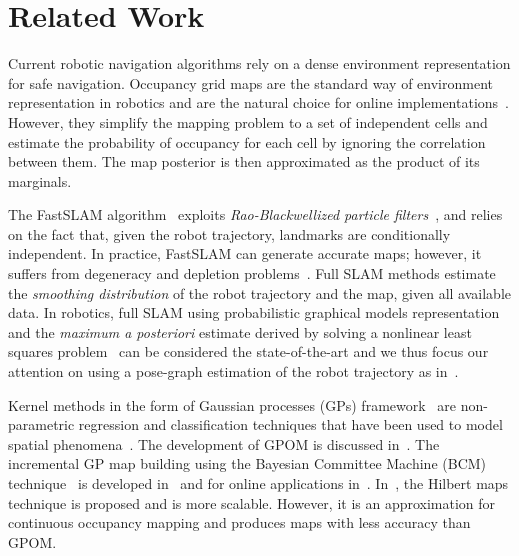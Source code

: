 \documentclass[letterpaper, 10 pt, journal, twoside]{IEEEtran}  %
\begin{document}
\section{Related Work}

Current robotic navigation algorithms rely on a dense environment representation for safe navigation. Occupancy grid maps are the standard way of environment representation in robotics and are the natural choice for online implementations~\cite{moravec1985high,elfes1987sonar,thrun2003learning,hornung2013octomap,merali2014optimizing}. However, they simplify the mapping problem to a set of independent cells and estimate the probability of occupancy for each cell by ignoring the correlation between them. The map posterior is then approximated as the product of its marginals.

The FastSLAM algorithm~\cite{Montemerlo03fastslam2} exploits \emph{Rao-Blackwellized particle filters}~\cite{doucet2000rao}, and relies on the fact that, given the robot trajectory, landmarks are conditionally independent. In practice, FastSLAM can generate accurate maps; however, it suffers from degeneracy and depletion problems~\cite{bailey2006consistencypf}. Full SLAM methods estimate the \emph{smoothing distribution} of the robot trajectory and the map, given all available data. In robotics, full SLAM using probabilistic graphical models representation and the \emph{maximum a posteriori} estimate derived by solving a nonlinear least squares problem~\cite{dellaert2006square,grisetti2008online,kaess2011isam2,konolige2010efficient,thrun2006graph} can be considered the state-of-the-art and we thus focus our attention on using a pose-graph estimation of the robot trajectory as in~\cite{ila2010information,valencia2013planning}.

Kernel methods in the form of Gaussian processes (GPs) framework~\cite{rasmussen2006gaussian} are non-parametric regression and classification techniques that have been used to model spatial phenomena~\cite{vasudevan2009gaussian}. The development of GPOM is discussed in~\cite{o2009contextual,t2012gaussian}. The incremental GP map building using the Bayesian Committee Machine (BCM) technique~\cite{tresp2000bayesian} is developed in~\cite{kim2012building,jadidi2013exploration,jadidi2013acra,maani2014com} and for online applications in~\cite{7487232}. In~\cite{ramoshilbert}, the Hilbert maps technique is proposed and is more scalable. However, it is an approximation for continuous occupancy mapping and produces maps with less accuracy than GPOM.
\end{document}
